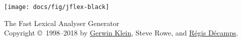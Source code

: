 \documentclass{article}
\begin{document}
\centerline{\texttt{[image: docs/fig/jflex-black]}}

\begin{center}
\sffamily
{\Large The Fast Lexical Analyser Generator}\\
\smallskip\smallskip
Copyright \copyright\ 1998--2018 by \href{http://www.doclsf.de}{Gerwin Klein},
Steve Rowe, and \href{http://regis.decamps.info/}{Régis Décamps}.
\end{center}


\end{document}
